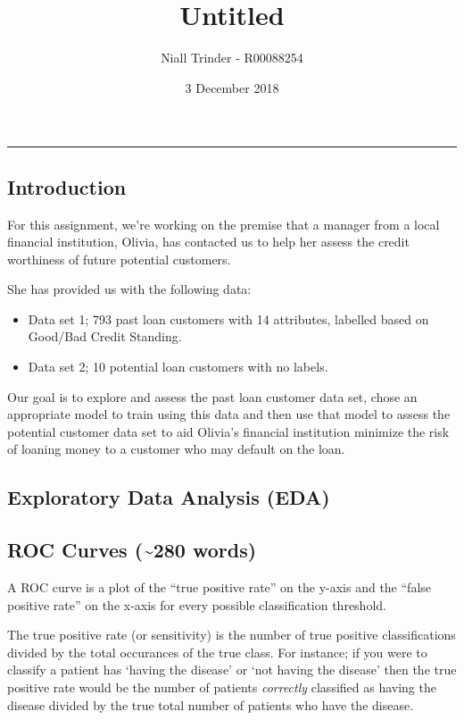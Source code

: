 \documentclass[]{article}
\title{Untitled}
\author{Niall Trinder - R00088254}
\date{3 December 2018}
\providecommand{\tightlist}{%
  \setlength{\itemsep}{0pt}\setlength{\parskip}{0pt}}
\begin{document}
\maketitle

\begin{center}\rule{0.5\linewidth}{\linethickness}\end{center}

\subsection{Introduction}\label{introduction}

For this assignment, we're working on the premise that a manager from a
local financial institution, Olivia, has contacted us to help her assess
the credit worthiness of future potential customers.

She has provided us with the following data:

\begin{itemize}
\tightlist
\item
  Data set 1; 793 past loan customers with 14 attributes, labelled based
  on Good/Bad Credit Standing.
\item
  Data set 2; 10 potential loan customers with no labels.
\end{itemize}

Our goal is to explore and assess the past loan customer data set, chose
an appropriate model to train using this data and then use that model to
assess the potential customer data set to aid Olivia's financial
institution minimize the risk of loaning money to a customer who may
default on the loan.

\subsection{Exploratory Data Analysis
(EDA)}\label{exploratory-data-analysis-eda}

\subsection{ROC Curves (\textasciitilde{}280
words)}\label{roc-curves-280-words}

A ROC curve is a plot of the ``true positive rate'' on the y-axis and
the ``false positive rate'' on the x-axis for every possible
classification threshold.

The true positive rate (or sensitivity) is the number of true positive
classifications divided by the total occurances of the true class. For
instance; if you were to classify a patient has `having the disease' or
`not having the disease' then the true positive rate would be the number
of patients \emph{correctly} classified as having the disease divided by
the true total number of patients who have the disease.
\end{document}
